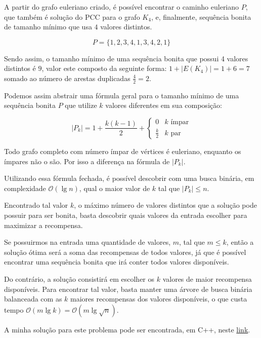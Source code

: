 \documentclass{article}
\begin{document}
        A partir do grafo euleriano criado, é possível encontrar o caminho euleriano $P$, que também é solução do PCC para o grafo $K_4$, e, finalmente, sequência bonita de tamanho mínimo que usa $4$ valores distintos.

        \[ P = \{1, 2, 3, 4, 1, 3, 4, 2, 1\} \]

        Sendo assim, o tamanho mínimo de uma sequência bonita que possui 4 valores distintos é $9$, valor este composto da seguinte forma: $1 + |E(K_4)| = 1 + 6 = 7$ somado ao número de arestas duplicadas $\frac{4}{2} = 2$.


        Podemos assim abstrair uma fórmula geral para o tamanho mínimo de uma sequência bonita $P$ que utilize $k$ valores diferentes em sua composição:

        
        \[ |P_k|
             =  1 + \frac{k(k-1)}{2} + 
            \begin{cases} 
                0 & k \text{ ímpar} \\
                \frac{k}{2} & k \text{ par}
            \end{cases}
        \]

        Todo grafo completo com número ímpar de vértices é euleriano, enquanto os ímpares não o são. 
        Por isso a diferença na fórmula de $|P_k|$.

        Utilizando essa fórmula fechada, é possível descobrir com uma busca binária, em complexidade $\mathcal{O}(\lg{n})$, qual o maior valor de $k$ tal que $|P_k| \leq n$.

        Encontrado tal valor $k$, o máximo número de valores distintos que a solução pode possuir para ser bonita, basta descobrir quais valores da entrada escolher para maximizar a recompensa.
        

        Se possuirmos na entrada uma quantidade de valores, $m$, tal que $m \leq k$, então a solução ótima será a soma das recompensas de todos valores, já que é possível encontrar uma sequência bonita que irá conter todos valores disponíveis.

        Do contrário, a solução consistirá em escolher os $k$ valores de maior recompensa disponíveis.
    Para encontrar tal valor, basta manter uma árvore de busca binária balanceada com as $k$ maiores recompensas dos valores disponíveis, o que custa tempo $\mathcal{O}(m\lg k) = \mathcal{O}(m\lg \sqrt{n})$.

    A minha solução para este problema pode ser encontrada, em C++, neste \href{https://github.com/gafeol/competitive-programming/blob/master/ojs/cf/367/C.cpp}{link}.
\end{document}
